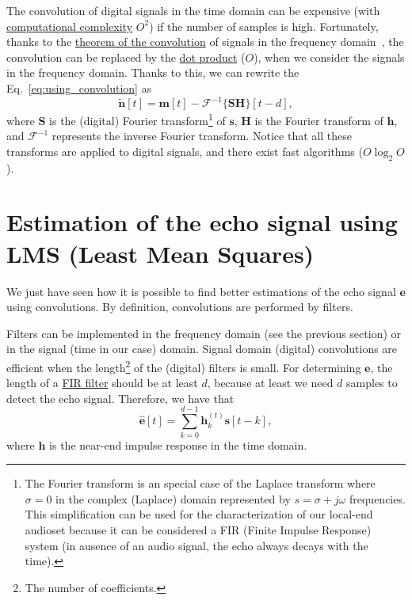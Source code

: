 The convolution of digital signals in the time domain can be expensive
(with
\href{https://en.wikipedia.org/wiki/Computational_complexity_theory}{computational
  complexity} $O^2$) if the number of samples is high. Fortunately,
thanks to the \href{https://en.wikipedia.org/wiki/Convolution}{theorem
  of the convolution} of signals in the frequency
domain~\cite{kovacevic2013fourier,Oppenheim2}, the convolution can be
replaced by the \href{https://en.wikipedia.org/wiki/Dot_product}{dot
  product} ($O$), when we consider the signals in the frequency
domain. Thanks to this, we can rewrite the Eq.~\eqref{eq:using_convolution} as
\begin{equation}
  \tilde{\mathbf n}[t] = {\mathbf m}[t] - {\mathcal F}^{-1}\{{\mathbf S}{\mathbf H}\}[t-d],
  \label{eq:faster}
\end{equation}
where ${\mathbf S}$ is the (digital) Fourier transform\footnote{The
  Fourier transform is an special case of the Laplace transform where
  $\sigma=0$ in the complex (Laplace) domain represented by
  $s=\sigma+j\omega$ frequencies. This simplification can be used for
  the characterization of our local-end audioset because it can be
  considered a FIR (Finite Impulse Response) system (in ausence of an
  audio signal, the echo always decays with the time).} of
${\mathbf s}$, ${\mathbf H}$ is the Fourier transform of
${\mathbf h}$, and ${\mathcal F}^{-1}$ represents the inverse Fourier
transform. Notice that all these transforms are applied to digital
signals, and there exist fast algorithms ($O\log_2O$).

\section{Estimation of the echo signal using LMS (Least Mean Squares)}
We just have seen how it is possible to find better estimations of the
echo signal ${\mathbf e}$ using convolutions. By definition,
convolutions are performed by filters.

Filters can be implemented in the frequency domain (see the previous
section) or in the signal (time in our case) domain. Signal domain
(digital) convolutions are efficient when the length\footnote{The
  number of coefficients.} of the (digital) filters is small. For
determining ${\mathbf e}$, the length of a
\href{https://en.wikipedia.org/wiki/Finite_impulse_response}{FIR
  filter} should be at least $d$, because at least we need $d$ samples
to detect the echo signal. Therefore, we have that
\begin{equation}
  \hat{\mathbf e}[t] = \sum_{k=0}^{d-1}{\mathbf h}_k^{(t)}{\mathbf s}[t-k],
\end{equation}
where ${\mathbf h}$ is the near-end impulse response in the time
domain.

